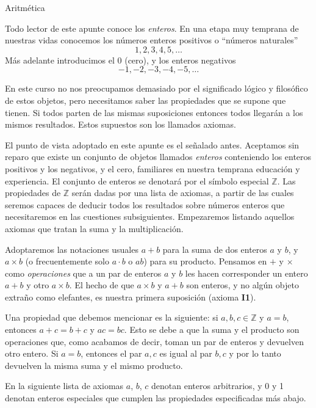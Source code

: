 \documentclass[11pt,spanish,makeidx]{amsbook}
\theoremstyle{definition}
\theoremstyle{remark}
\begin{document}
\begin{section}{Aritmética}\label{1.1}

Todo lector de este apunte conoce los {\it enteros}. En una etapa muy temprana de nuestras vidas conocemos los números enteros positivos o ``números naturales'' 
$$1,2,3,4,5,\ldots$$
Más adelante introducimos el 0 (cero), y los enteros negativos 
$$
-1,-2,-3,-4,-5,\ldots 
$$ 

En este curso no nos preocupamos demasiado por el significado lógico y filosófico de estos objetos, pero necesitamos saber las propiedades que se supone que tienen. Si todos parten de las mismas suposiciones entonces todos llegarán a los mismos resultados. Estos supuestos son los llamados axiomas.

El punto de vista adoptado en este apunte es el señalado antes. Aceptamos sin reparo que existe un conjunto de objetos llamados { \it enteros} conteniendo los enteros positivos y los negativos, y el cero, familiares en nuestra temprana educación y experiencia. El conjunto de enteros se denotará por el símbolo especial ${\mathbb Z}$. Las propiedades de ${\mathbb Z}$ serán dadas por una lista de axiomas, a partir de las cuales seremos capaces de deducir todos los resultados sobre números enteros que necesitaremos en las cuestiones subsiguientes. Empezaremos listando aquellos axiomas que tratan la suma y la multiplicación.

Adoptaremos las notaciones usuales $a+b$ para la suma de dos enteros $a$ y $b$, y $a \times b$ (o frecuentemente solo $a \cdot b$ o $ab$) para su producto. Pensamos en $+$ y $\times$ como {\it operaciones} que a un par de enteros $a$ y $b$ les hacen corresponder un entero $a+b$ y otro $a\times b$. El hecho de que $a \times b$ y $a+b$ son enteros, y no algún objeto extra\~no como elefantes, es nuestra primera suposición (axioma {\bf I1}). 

Una propiedad que debemos mencionar es la siguiente: si $a,b, c \in \mathbb Z$  y $a=b$, entonces $a+c = b+c$ y $ac = bc$. Esto se debe a que la suma y el producto son operaciones que, como acabamos de decir, toman un par de enteros y  devuelven otro entero. Si $a=b$, entonces el  par $a,c$ es igual al par $b,c$ y por lo tanto devuelven la misma suma y el mismo producto.

En la siguiente lista de axiomas $a$, $b$, $c$ denotan enteros arbitrarios, y 0 y 1 denotan enteros especiales que cumplen las propiedades especificadas más abajo.


\end{section}
\end{document}
